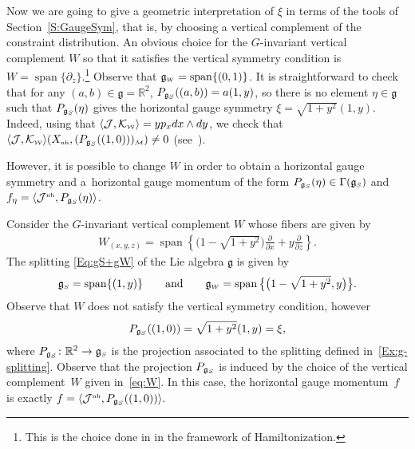 \documentclass[10pt,a4paper]{amsart}
\numberwithin{equation}{section}
\def\W{\mathcal{W}}
\def\M{\mathcal{M}}
\def\J{\mathcal{J}}
\def\R{\mathbb{R}}
\def\g{\mathfrak{g}}
\def\nh{{\mbox{\tiny{nh}}}}
\def\subW{{\mbox{\tiny{$\W$}}}}
\def\subM{{\mbox{\tiny{$\M$}}}}
\def\subSS{{\mbox{\tiny{$S$}}}}
\def\subWW{{\mbox{\tiny{$W$}}}}
\begin{document}
\begin{Example}
Now we are going to give a geometric interpretation of $\xi$ in terms of the tools of Section~\ref{S:GaugeSym},
that is, by choosing a vertical complement of the constraint distribution.
An obvious choice for the $G$-invariant vertical complement
$W$ so that it satisf\/ies the vertical symmetry condition is
$W = \operatorname{span}\{ \partial_z \}$.\footnote{This is the choice
done in \cite{Paula} in the framework of Hamiltonization.}
Observe that $\mathfrak{g}_\subWW = \operatorname{span}\{(0,1)\}$.
It is straightforward to check that for any $(a,b) \in \mathfrak{g} = \R^2$,
 $P_{\mathfrak{g}_\subSS} ((a,b) ) = a (1,y)$, so there is no element
 $\eta\in\mathfrak{g}$ such that $P_{\mathfrak{g}_\subSS} (\eta )$ gives the
horizontal gauge symmetry $\xi= \sqrt{1+y^2}(1,y)$.
Indeed, using that $\langle \mathcal{J},\mathcal{K}_\subW\rangle = yp_x dx\wedge dy$, we check that
$\langle \mathcal{J},\mathcal{K}_\subW\rangle (X_{\nh},( P_{\mathfrak{g}_\subSS}((1,0)))_\subM )\neq 0$ (see~\cite{Paula}).

However, it is possible to change $W$ in order to obtain a horizontal gauge symmetry
and a~horizontal gauge momentum of the form
$P_{\mathfrak{g}_\subSS}(\eta) \in \Gamma(\mathfrak{g}_\subSS)$
and $f_\eta= \langle \J^\nh, P_{\mathfrak{g}_\subSS}(\eta) \rangle$.

Consider the $G$-invariant vertical complement $W$ whose f\/ibers are given by
\begin{gather}\label{eq:W}
 W_{(x,y,z)}= \operatorname{span} \left\{ \big(1-\sqrt{1+y^ 2}\big) \frac{\partial}{\partial x} + y \frac{\partial}{\partial z} \right\}.
\end{gather}
The splitting  \eqref{Eq:gS+gW} of the Lie algebra $\g$ is given by
\begin{gather} \label{Ex:g-splitting}
 \mathfrak{g}_\subSS = \operatorname{span} \{ (1,y)\} \qquad \mbox{and} \qquad \mathfrak{g}_\subWW = \operatorname{span}\big\{\big(1-\sqrt{1+y^ 2} ,y\big)\big\}  .
\end{gather}
Observe that $W$ does not satisfy the vertical symmetry condition, however
\begin{gather*}
  P_{\mathfrak{g}_\subSS} ((1,0)) = \sqrt{1+y^2}(1,y) = \xi,
\end{gather*}
where $P_{\mathfrak{g}_\subSS} \colon \R^2 \to \mathfrak{g}_\subSS$ is the projection
associated to the splitting def\/ined in~\eqref{Ex:g-splitting}.
Observe that the projection $P_{\mathfrak{g}_\subSS}$ is induced by the choice of the vertical complement~$W$ given in~\eqref{eq:W}.
In this case, the horizontal gauge momentum~$f$ is exactly
$f = \langle \J^\nh, P_{\mathfrak{g}_\subSS}((1,0)) \rangle.$
\end{Example}
\end{document}
